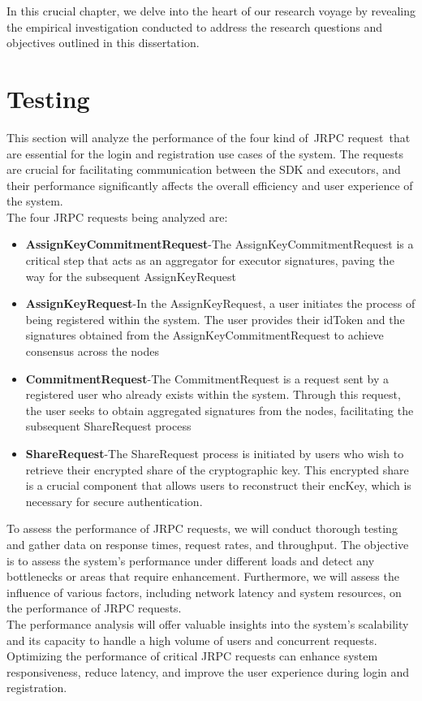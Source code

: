 \documentclass[../Main.tex]{subfiles}
\begin{document}
In this crucial chapter, we delve into the heart of our research voyage by revealing the empirical investigation conducted to address the research questions and objectives outlined in this dissertation. 
\section{Testing}
This section will analyze the performance of the four kind of JRPC request that are essential for the login and registration use cases of the system. The requests are crucial for facilitating communication between the SDK and executors, and their performance significantly affects the overall efficiency and user experience of the system.\\
\indent The four JRPC requests being analyzed are:
\begin{itemize}
  \item \textbf{AssignKeyCommitmentRequest}-The AssignKeyCommitmentRequest is a critical step that acts as an aggregator for executor signatures, paving the way for the subsequent AssignKeyRequest
  \item \textbf{AssignKeyRequest}-In the AssignKeyRequest, a user initiates the process of being registered within the system. The user provides their idToken and the signatures obtained from the AssignKeyCommitmentRequest to achieve consensus across the nodes
  \item \textbf{CommitmentRequest}-The CommitmentRequest is a request sent by a registered user who already exists within the system. Through this request, the user seeks to obtain aggregated signatures from the nodes, facilitating the subsequent ShareRequest process
  \item \textbf{ShareRequest}-The ShareRequest process is initiated by users who wish to retrieve their encrypted share of the cryptographic key. This encrypted share is a crucial component that allows users to reconstruct their encKey, which is necessary for secure authentication.
\end{itemize}
To assess the performance of JRPC requests, we will conduct thorough testing and gather data on response times, request rates, and throughput. The objective is to assess the system's performance under different loads and detect any bottlenecks or areas that require enhancement. Furthermore, we will assess the influence of various factors, including network latency and system resources, on the performance of JRPC requests.\\
\indent The performance analysis will offer valuable insights into the system's scalability and its capacity to handle a high volume of users and concurrent requests. Optimizing the performance of critical JRPC requests can enhance system responsiveness, reduce latency, and improve the user experience during login and registration.\\
\end{document}
